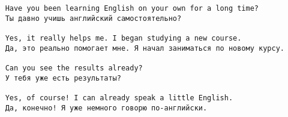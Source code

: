 \subsection*{}
\begin{verbatim}
    Have you been learning English on your own for a long time?
    Ты давно учишь английский самостоятельно?

    Yes, it really helps me. I began studying a new course.
    Да, это реально помогает мне. Я начал заниматься по новому курсу.

    Can you see the results already?
    У тебя уже есть результаты?

    Yes, of course! I can already speak a little English.
    Да, конечно! Я уже немного говорю по-английски.
\end{verbatim}